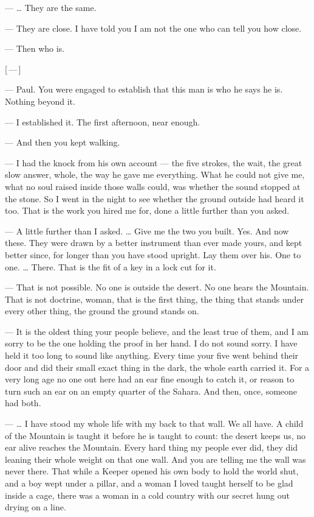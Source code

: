 \begin{room}
--- \ldots{} They are the same.

--- They are close. I have told you I am not the one who can tell you how close.

--- Then who is.

\centerline{[\,---\,]}

--- Paul. You were engaged to establish that this man is who he says he is. Nothing beyond it.

--- I established it. The first afternoon, near enough.

--- And then you kept walking.

--- I had the knock from his own account --- the five strokes, the wait, the great slow answer, whole, the way he gave me everything. What he could not give me, what no soul raised inside those walls could, was whether the sound stopped at the stone. So I went in the night to see whether the ground outside had heard it too. That is the work you hired me for, done a little further than you asked.

--- A little further than I asked. \ldots{} Give me the two you built. Yes. And now these. They were drawn by a better instrument than ever made yours, and kept better since, for longer than you have stood upright. Lay them over his. One to one. \ldots{} There. That is the fit of a key in a lock cut for it.

--- That is not possible. No one is outside the desert. No one hears the Mountain. That is not doctrine, woman, that is the first thing, the thing that stands under every other thing, the ground the ground stands on.

--- It is the oldest thing your people believe, and the least true of them, and I am sorry to be the one holding the proof in her hand. I do not sound sorry. I have held it too long to sound like anything. Every time your five went behind their door and did their small exact thing in the dark, the whole earth carried it. For a very long age no one out here had an ear fine enough to catch it, or reason to turn such an ear on an empty quarter of the Sahara. And then, once, someone had both.

--- \ldots{} I have stood my whole life with my back to that wall. We all have. A child of the Mountain is taught it before he is taught to count: the desert keeps us, no ear alive reaches the Mountain. Every hard thing my people ever did, they did leaning their whole weight on that one wall. And you are telling me the wall was never there. That while a Keeper opened his own body to hold the world shut, and a boy wept under a pillar, and a woman I loved taught herself to be glad inside a cage, there was a woman in a cold country with our secret hung out drying on a line.


\end{room}
